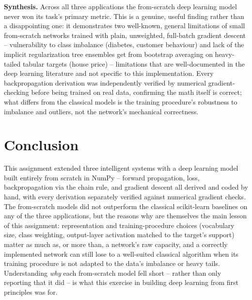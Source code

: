 \documentclass[11pt, a4paper]{article}
\begin{document}
\textbf{Synthesis.} Across all three applications the from-scratch deep learning model
never won its task's primary metric. This is a genuine, useful finding rather than a
disappointing one: it demonstrates two well-known, general limitations of small
from-scratch networks trained with plain, unweighted, full-batch gradient descent --
vulnerability to class imbalance (diabetes, customer behaviour) and lack of the implicit
regularization tree ensembles get from bootstrap averaging on heavy-tailed tabular targets
(house price) -- limitations that are well-documented in the deep learning literature and
not specific to this implementation. Every backpropagation derivation was independently
verified by numerical gradient-checking before being trained on real data, confirming the
math itself is correct; what differs from the classical models is the training procedure's
robustness to imbalance and outliers, not the network's mechanical correctness.

\section{Conclusion}

This assignment extended three intelligent systems with a deep learning model built
entirely from scratch in NumPy -- forward propagation, loss, backpropagation via the chain
rule, and gradient descent all derived and coded by hand, with every derivation separately
verified against numerical gradient checks. The from-scratch models did not outperform the
classical scikit-learn baselines on any of the three applications, but the reasons why are
themselves the main lesson of this assignment: representation and training-procedure
choices (vocabulary size, class weighting, output-layer activation matched to the target's
support) matter as much as, or more than, a network's raw capacity, and a correctly
implemented network can still lose to a well-suited classical algorithm when its training
procedure is not adapted to the data's imbalance or heavy tails. Understanding \emph{why}
each from-scratch model fell short -- rather than only reporting that it did -- is what
this exercise in building deep learning from first principles was for.

\end{document}
